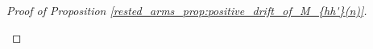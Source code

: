 \begin{proof}[Proof of Proposition \ref{rested_arms_prop:positive_drift_of_M_{hh'}(n)}]
\begin{enumerate}
\end{enumerate}


\end{proof}
